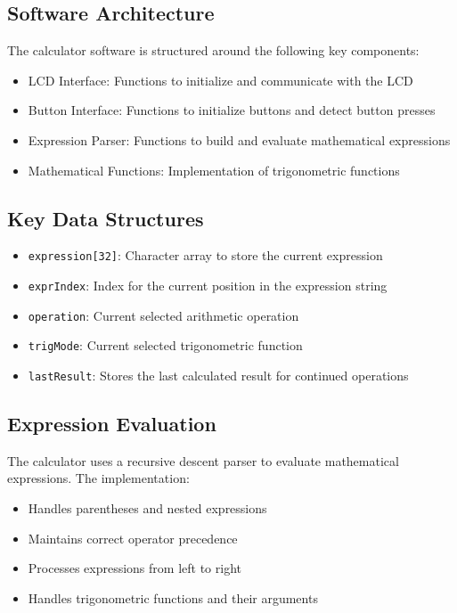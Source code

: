 \documentclass[12pt,a4paper]{article}
\begin{document}
\subsection{Software Architecture}
The calculator software is structured around the following key components:
\begin{itemize}
    \item LCD Interface: Functions to initialize and communicate with the LCD
    \item Button Interface: Functions to initialize buttons and detect button presses
    \item Expression Parser: Functions to build and evaluate mathematical expressions
    \item Mathematical Functions: Implementation of trigonometric functions
\end{itemize}

\subsection{Key Data Structures}
\begin{itemize}
    \item \texttt{expression[32]}: Character array to store the current expression
    \item \texttt{exprIndex}: Index for the current position in the expression string
    \item \texttt{operation}: Current selected arithmetic operation
    \item \texttt{trigMode}: Current selected trigonometric function
    \item \texttt{lastResult}: Stores the last calculated result for continued operations
\end{itemize}

\subsection{Expression Evaluation}
The calculator uses a recursive descent parser to evaluate mathematical expressions. The implementation:
\begin{itemize}
    \item Handles parentheses and nested expressions
    \item Maintains correct operator precedence
    \item Processes expressions from left to right
    \item Handles trigonometric functions and their arguments
\end{itemize}
\end{document}
